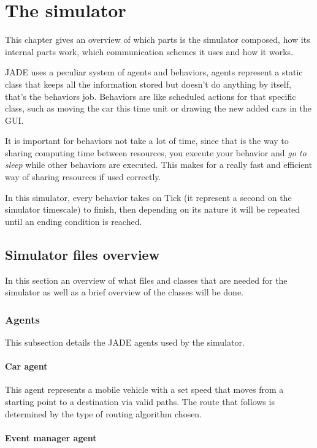 \chapter{The simulator}

This chapter gives an overview of which parts is the simulator composed, how its internal parts work, which communication schemes it uses and how it works.

JADE uses a peculiar system of agents and behaviors, agents represent a static class that keeps all the information stored but doesn't do anything by itself, that's the behaviors job. Behaviors are like scheduled actions for that specific class, such as moving the car this time unit or drawing the new added cars in the GUI.

It is important for behaviors not take a lot of time, since that is the way to sharing computing time between resources, you execute your behavior and \textit{go to sleep} while other behaviors are executed. This makes for a really fast and efficient way of sharing resources if used correctly.

In this simulator, every behavior takes on Tick (it represent a second on the simulator timescale) to finish, then depending on its nature it will be repeated until an ending condition is reached.

\section{Simulator files overview}

In this section an overview of what files and classes that are needed for the simulator as well as a brief overview of the classes will be done.

\subsection{Agents}

This subsection details the JADE agents used by the simulator.

\subsubsection{Car agent}

This agent represents a mobile vehicle with a set speed that moves from a starting point to a destination via valid paths. The route that follows is determined by the type of routing algorithm chosen.

\subsubsection{Event manager agent}

